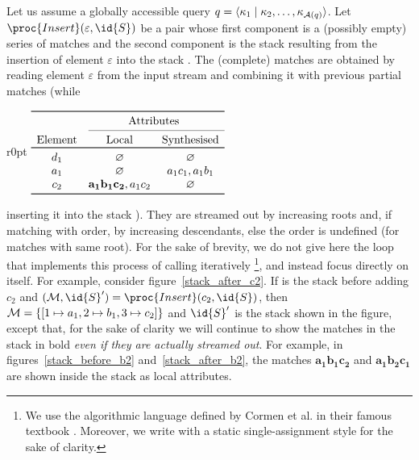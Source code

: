Let us assume a globally accessible query \(q = \langle \kappa_1 \mid \kappa_2,
  \dots, \kappa_{{\cal A}(q)}\rangle\). Let \(\proc{Insert} (\varepsilon,
\id{S})\) be a pair whose first component is a (possibly empty) series
of matches and the second component is the stack resulting from the
insertion of element \(\varepsilon\) into the stack . The
(complete) matches are obtained by reading element \(\varepsilon\)
from the input stream and combining it with previous partial matches
(while
\begin{wrapfigure}[9]{r}{0pt}
\centering
\(
\begin{array}{ccc}
\toprule
& \multicolumn{2}{c}{\text{Attributes}}\\
\cmidrule(l){2-3}
\text{Element} & \text{Local} & \text{Synthesised}\\
\toprule
d_1 & \varnothing & \varnothing\\
a_1 & \varnothing & a_1c_1, a_1b_1\\
c_2 & \mathbf{a_1b_1c_2}, a_1c_2 & \varnothing\\
\bottomrule
\end{array}
\)
\caption{Stack after adding \(c_2\).\label{stack_after_c2}}
\end{wrapfigure}
inserting it into the stack ). They are streamed out by
increasing roots and, if matching with order, by increasing
descendants, else the order is undefined (for matches with same
root). For the sake of brevity, we do not give here the loop that
implements this process of calling iteratively
\footnote{We use the algorithmic language defined by
  Cormen et al. in their famous textbook \cite{Cormen:2001}. Moreover,
  we write with a static single-assignment style for the sake of
  clarity.}, and instead focus directly on  itself. For
example, consider figure~\ref{stack_after_c2}. If  is the stack
before adding \(c_2\) and \(({\cal M},\id{S}') = \proc{Insert}(c_2,
\id{S})\), then \({\cal M} = \{[1 \mapsto a_1, 2 \mapsto b_1, 3
  \mapsto c_2]\}\) and \(\id{S}'\) is the stack shown in the figure,
except that, for the sake of clarity we will continue to show the
matches in the stack in bold \emph{even if they are actually streamed
  out}. For example, in figures~\ref{stack_before_b2}
and~\ref{stack_after_b2}, the matches \(\mathbf{a_1b_1c_2}\) and
\(\mathbf{a_1b_2c_1}\) are shown inside the stack as local attributes.
